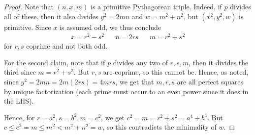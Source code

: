 \begin{proof}
    Note that $(n,x,m)$ is a primitive Pythagorean triple. Indeed, if $p$ divides all of these, then it also divides $y^2 = 2mn$ and $w = m^2+n^2$, but $(x^2,y^2,w)$ is primitive. Since $x$ is assumed odd, we thus conclude
    \begin{align*} x = r^2-s^2 && n = 2rs && m = r^2+s^2 \end{align*}
    for $r,s$ coprime and not both odd.

    For the second claim, note that if $p$ divides any two of $r,s,m$, then it divides the third since $m=r^2+s^2$. But $r,s$ are coprime, so this cannot be. Hence, as noted, since $y^2 = 2mn = 2m(2rs) = 4mrs$, we get that $m,r,s$ are all perfect squares by unique factorization (each prime must occur to an even power since it does in the LHS).

    Hence, for $r=a^2,s=b^2,m=c^2$, we get $c^2 = m = r^2+s^2 = a^4+b^4$. But $c \leq c^2 = m \leq m^2 < m^2+n^2 = w$, so this contradicts the minimality of $w$.
\end{proof}